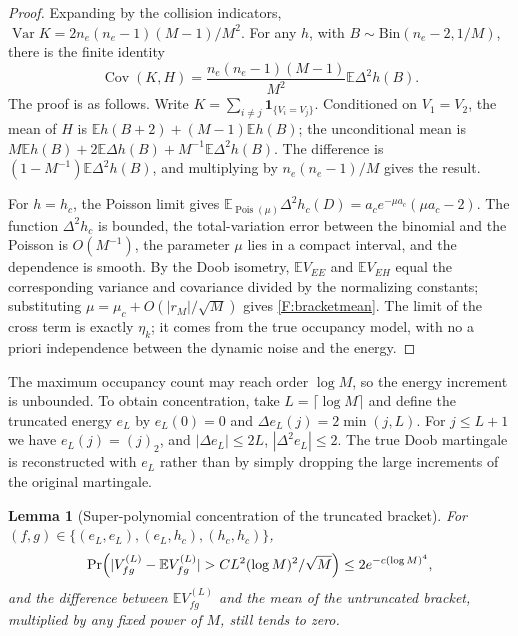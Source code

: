 \documentclass[a4paper,11pt]{article}
\newtheorem{lemma}[theorem]{Lemma}
\numberwithin{equation}{section}
\newcommand{\E}{\mathbb E}
\newcommand{\Var}{\operatorname{Var}}
\newcommand{\Cov}{\operatorname{Cov}}
\newcommand{\Pois}{\operatorname{Pois}}
\begin{document}
\begin{proof}
Expanding by the collision indicators, $\Var K=2n_e(n_e-1)(M-1)/M^2$. For any $h$, with
$B\sim\mathrm{Bin}(n_e-2,1/M)$, there is the finite identity
\begin{equation}
\Cov(K,H)=\frac{n_e(n_e-1)(M-1)}{M^2}\E\Delta^2h(B).\label{F:covKH}
\end{equation}
The proof is as follows. Write $K=\sum_{i\ne j}\mathbf1_{\{V_i=V_j\}}$. Conditioned on $V_1=V_2$, the mean of
$H$ is $\E h(B+2)+(M-1)\E h(B)$; the unconditional mean is
$M\E h(B)+2\E\Delta h(B)+M^{-1}\E\Delta^2h(B)$. The difference is $(1-M^{-1})\E\Delta^2h(B)$, and multiplying
by $n_e(n_e-1)/M$ gives the result.

For $h=h_c$, the Poisson limit gives $\E_{\Pois(\mu)}\Delta^2h_c(D)=a_ce^{-\mu a_c}(\mu a_c-2)$. The function
$\Delta^2h_c$ is bounded, the total-variation error between the binomial and the Poisson is $O(M^{-1})$, the
parameter $\mu$ lies in a compact interval, and the dependence is smooth. By the Doob isometry, $\E V_{EE}$
and $\E V_{EH}$ equal the corresponding variance and covariance divided by the normalizing constants;
substituting $\mu=\mu_c+O(|r_M|/\sqrt M)$ gives \eqref{F:bracketmean}. The limit of the cross term is exactly
$\eta_k$; it comes from the true occupancy model, with no a priori independence between the dynamic noise and
the energy.
\end{proof}

The maximum occupancy count may reach order $\log M$, so the energy increment is unbounded. To obtain
concentration, take $L=\lceil\log M\rceil$ and define the truncated energy $e_L$ by $e_L(0)=0$ and
$\Delta e_L(j)=2\min(j,L)$. For $j\le L+1$ we have $e_L(j)=(j)_2$, and $|\Delta e_L|\le2L$,
$|\Delta^2e_L|\le2$. The true Doob martingale is reconstructed with $e_L$ rather than by simply dropping the
large increments of the original martingale.

\begin{lemma}[Super-polynomial concentration of the truncated bracket]\label{F:lem:conc}
For $(f,g)\in\{(e_L,e_L),(e_L,h_c),(h_c,h_c)\}$,
\begin{equation}
\Pr\Bigl(|V^{(L)}_{fg}-\E V^{(L)}_{fg}|>CL^2(\log M)^2/\sqrt M\Bigr)\le2e^{-c(\log M)^4},\label{F:conc}
\end{equation}
and the difference between $\E V^{(L)}_{fg}$ and the mean of the untruncated bracket, multiplied by any fixed
power of $M$, still tends to zero.
\end{lemma}
\end{document}
